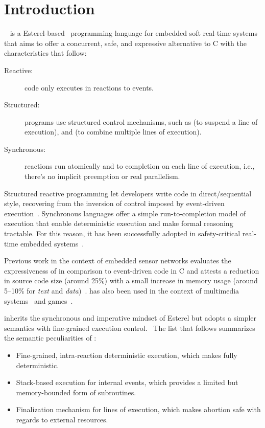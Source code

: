 \section{Introduction}
\label{sec.intro}

\CEU~\cite{ceu.sensys13,ceu.tecs17} is a Esterel-based~\cite{esterel.ieee91}
programming language for embedded soft real-time systems that aims to offer a
concurrent, safe, and expressive alternative to C with the characteristics that
follow:
%
\begin{description}
\item [Reactive:] code only executes in reactions to events.
\item [Structured:] programs use structured control mechanisms, such as
     (to suspend a line of execution), and  (to combine
    multiple lines of execution).
\item [Synchronous:] reactions run atomically and to completion on each line of
    execution, i.e., there's no implicit preemption or real parallelism.
\end{description}
%
Structured reactive programming let developers write code in direct/sequential
style, recovering from the inversion of control imposed by event-driven
execution~\cite{rp.deprecating,rp.rescala,sync_async.cooperative}.
%
Synchronous languages offer a simple run-to-completion model of execution that
enable deterministic execution and make formal reasoning tractable.
For this reason, it has been successfully adopted in safety-critical real-time
embedded systems~\cite{rp.twelve}.

Previous work in the context of embedded sensor networks evaluates the
expressiveness of \CEU in comparison to event-driven code in C and attests a
reduction in source code size (around 25\%) with a small increase in memory
usage (around 5--10\% for \emph{text} and \emph{data})~\cite{ceu.sensys13}.
%
\CEU has also been used in the context of multimedia
systems~\cite{ceumedia.webmedia16} and games~\cite{ceu.mod15}.

\CEU inherits the synchronous and imperative mindset of Esterel but adopts a
simpler semantics with fine-grained execution control.~\cite{ceu.tecs17}
%
The list that follows summarizes the semantic peculiarities of \CEU:
%
\begin{itemize}
    \item Fine-grained, intra-reaction deterministic execution, which makes
          \CEU fully deterministic.
    \item Stack-based execution for internal events, which provides a limited
          but memory-bounded form of subroutines.
    \item Finalization mechanism for lines of execution, which makes abortion
          safe with regards to external resources.
\end{itemize}

